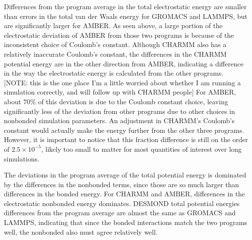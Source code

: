 Differences from the program average in the total electrostatic energy
are smaller than errors in the total van der Waals energy for GROMACS
and LAMMPS, but are significantly larger for AMBER.  As seen above, a
large portion of the electrostatic deviation of AMBER from those two
programs is because of the inconsistent choice of Coulomb's constant.
Although CHARMM also has a relatively inaccurate Coulomb's constant,
the differences in the CHARMM potential energy are in the other
direction from AMBER, indicating a difference in the way the
electrostatic energy is calculated from the other programs.  [NOTE:
  this is the one place I'm a little worried about whether I am
  running a simulation correctly, and will follow up with CHARMM
  people] For AMBER, about 70\% of this deviation is due to the
Coulomb constant choice, leaving significantly less of the deviation
from other programs due to other choices in nonbonded simulation
parameters. An adjustment in CHARMM's Coulomb's constant would
actually make the energy further from the other three programs.
However, it is important to notice that this fraction difference is
still on the order of $2.5 \times 10^{-5}$, likely too small to matter
for most quantities of interest over long simulations.

The deviations in the program average of the total potential energy is
dominated by the differences in the nonbonded terms, since those are
so much larger than differences in the bonded energy.  For CHARMM and
AMBER, differences in the electrostatic nonbonded energy
dominates. DESMOND total potential energies differences from the
program average are almost the same as GROMACS and LAMMPS, indicating
that since the bonded interactions match the two programs well, the
nonbonded also must agree relatively well.


